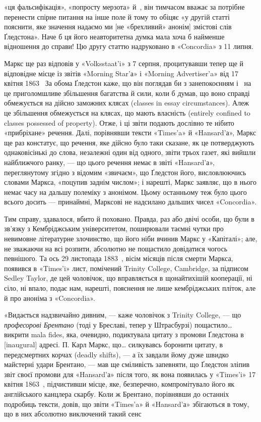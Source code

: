 \parcont{}  %
«ця фальсифікація», «попросту мерзота» й~, він тимчасом
вважає за потрібне перенести спірне питання на інше поле й тому
то обіцяє «у другій статті пояснити, яке значення надаємо ми
[не «брехливий» анонім] змістові слів Ґледстона». Наче б ця
його неавторитетна думка мала хоча б найменше відношення до
справи! Цю другу статтю надруковано в «Concordia» з 11 липня.

Маркс ще раз відповів у «Volksstaat’i» з 7 серпня, процитувавши
тепер ще й відповідне місце із звітів «Morning Star’а» і
«Morning Advertiser’a» від 17 квітня 1863~ За обома Ґледстон
каже, що він поглядав би з занепокоєнням і~ на це приголомшливе
збільшення багатства й сили, коли б думав, що воно
справді обмежується на дійсно заможних клясах (classes in essay
circumstances). Алеж це збільшення обмежується на клясах,
що мають власність (entirely confined to classes possessed of
property). Отже, і ці звіти подають дослівно те нібито «прибріхане»
речення. Далі, порівнявши тексти «Times’a» й «Hansard’а»,
Маркс ще раз констатує, що речення, яке дійсно було
таки сказане, як це потверджують однаковісінькі до слова, незалежні
один від одного, звіти трьох газет, які вийшли найближчого
ранку, — що цього речення немає в звіті «Hansard’а», переглянутому
згідно з відомим «звичаєм», що Ґледстон його,
висловлюючись словами Маркса, «поцупив заднім числом»; і
нарешті, Маркс заявляє, що в нього немає часу на дальшу полеміку
з анонімом. Цьому останньому теж було цього всього досить —
принаймні, Марксові не надсилано дальших чисел «Concordia».

Тим справу, здавалося, вбито й поховано. Правда, раз або
двічі особи, що були в зв’язку з Кембріджським університетом,
поширювали таємні чутки про невимовне літературне злочинство,
що його ніби вчинив Маркс у «Капіталі»; але, не зважаючи на
всі розпити, абсолютно не пощастило довідатися чогось певнішого.
Та ось 29 листопада 1883~, вісім місяців після смерти
Маркса, появився в «Times’i» лист, помічений Trinity College,
Cambridge, за підписом Sedley Taylor, де цей чоловічок, що вправляється
в щонайтихішій кооперації, ні сіло, ні впало, подає нам,
нарешті, пояснення не лише кембріджських пліток, але й про
аноніма з «Concordia».

«Видається надзвичайно дивним, — каже чоловічок з Trinity
College, — що \emph{професорові Брентано} (тоді у Бреславі, тепер у
Штрасбурзі) пощастило\dots{} викрити mala fides, яка, очевидно,
подиктувала цитату з промови Ґледстона в [inaugural] адресі.
П. Карл Маркс, що\dots{} силкувавсь боронити цитату, в передсмертних
корчах (deadly shifts), — а їх завдали йому дуже швидко
майстерні удари Брентано, — мав ще сміливість запевняти, що
Ґледстон зліпив звіт своєї промови для «Hansard’а» після того,
як вона появилась у «Times’i» 17 квітня 1863~, підчистивши
місце, яке, безперечно, компромітувало його як англійського
канцлера скарбу. Коли ж Брентано, порівнявши до останніх
подробиць тексти, довів, що звіти «Times’a» й «Hansard’а» збігаються
в тому, що в них абсолютно виключений такий сенс
\parbreak{}  %
